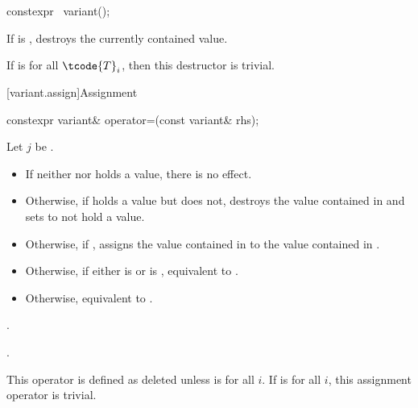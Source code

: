 %
\begin{itemdecl}
constexpr ~variant();
\end{itemdecl}

\begin{itemdescr}
\pnum
\effects
If  is ,
destroys the currently contained value.

\pnum
\remarks
If  is  for all $\tcode{T}_i$,
then this destructor is trivial.
\end{itemdescr}

[variant.assign]{Assignment}

%
\begin{itemdecl}
constexpr variant& operator=(const variant& rhs);
\end{itemdecl}

\begin{itemdescr}
\pnum
Let $j$ be .

\pnum
\effects
\begin{itemize}
\item
If neither  nor  holds a value, there is no effect.
\item
Otherwise, if  holds a value but  does not, destroys the value
contained in  and sets  to not hold a value.
\item
Otherwise, if , assigns the value contained in 
to the value contained in .
\item
Otherwise, if either 
is  or
 is ,
equivalent to .
\item
Otherwise, equivalent to .
\end{itemize}

\pnum
\ensures
{}.

\pnum
\returns
{}.

\pnum
\remarks
This operator is defined as deleted unless
is  for all $i$.
If 
is  for all $i$, this assignment operator is trivial.
\end{itemdescr}

